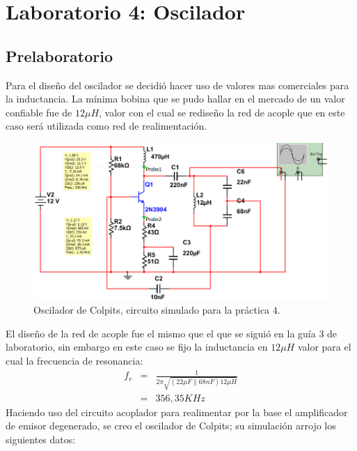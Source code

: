 \documentclass[11pt,graphicx,caption,rotating]{article}
\begin{document}
\section{Laboratorio 4: Oscilador}
\subsection{Prelaboratorio}
\noindent
Para el diseño del oscilador se decidió hacer uso de valores mas comerciales para la inductancia. La mínima bobina que se pudo hallar en el mercado de un valor confiable fue de $12 \mu H$, valor con el cual se rediseño la red de acople que en este caso será utilizada como  red de realimentación.
\begin{figure}[H]
	\centering
		\includegraphics[scale=0.5]{circuit_lab_4.png}
	\caption{Oscilador de Colpits, circuito simulado para la práctica $4$.}
	\label{fig14}
\end{figure}
\noindent
El diseño de la red de acople fue el mismo que el que se siguió en la guía 3 de laboratorio, sin embargo en este caso se fijo la inductancia en $12\mu H$ valor para el cual la frecuencia de resonancia:
\begin{eqnarray}
 f_r & = & \frac{1}{{2\pi \sqrt {\left( {22\mu F \parallel 68nF} \right)12\mu H} }} \label{ecu18}\\
& = & 356,35 KHz
\end{eqnarray}
\noindent
Haciendo uso del circuito acoplador para realimentar por la base el amplificador de emisor degenerado, se creo el oscilador de Colpits; su simulación arrojo los siguientes datos:
\end{document}
